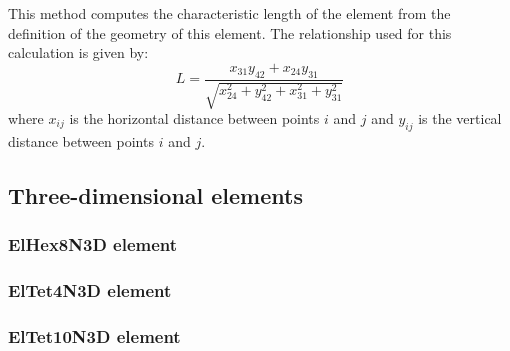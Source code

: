 This method computes the characteristic length of the element from the definition of the geometry of this element.
The relationship used for this calculation is given by:
\begin{equation}
L=\frac{x_{31} y_{42}+x_{24} y_{31}}{\sqrt{x_{24}^2+y_{42}^2+x_{31}^2+y_{31}^2}}
\end{equation}
where $x_{ij}$ is the horizontal distance between points $i$ and $j$ and $y_{ij}$ is the vertical distance between points $i$ and $j$.

\subsection{Three-dimensional elements}

\subsubsection{ElHex8N3D element}

\subsubsection{ElTet4N3D element}

\subsubsection{ElTet10N3D element}
